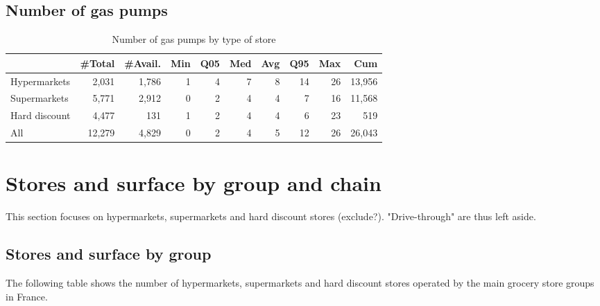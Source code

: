 \documentclass[11pt]{article}
\begin{document}
\subsection{Number of gas pumps}

\begin{table}[H]
\caption{Number of gas pumps by type of store}
\small

\begin{tabular}{lrrrrrrrrr}
\toprule
{} &     \#Total &    \#Avail. &        Min &        Q05 &        Med &        Avg &        Q95 &        Max &        Cum \\
\midrule
Hypermarkets  &      2,031 &      1,786 &          1 &          4 &          7 &          8 &         14 &         26 &     13,956 \\
Supermarkets  &      5,771 &      2,912 &          0 &          2 &          4 &          4 &          7 &         16 &     11,568 \\
Hard discount &      4,477 &        131 &          1 &          2 &          4 &          4 &          6 &         23 &        519 \\
\midrule
All           &     12,279 &      4,829 &          0 &          2 &          4 &          5 &         12 &         26 &     26,043 \\
\bottomrule
\end{tabular}

\end{table}



\section{Stores and surface by group and chain}

This section focuses on hypermarkets, supermarkets and hard discount stores (exclude?). "Drive-through" are thus left aside.

\subsection{Stores and surface by group}

The following table shows the number of hypermarkets, supermarkets and hard discount stores operated by the main grocery store groups in France.
\end{document}
